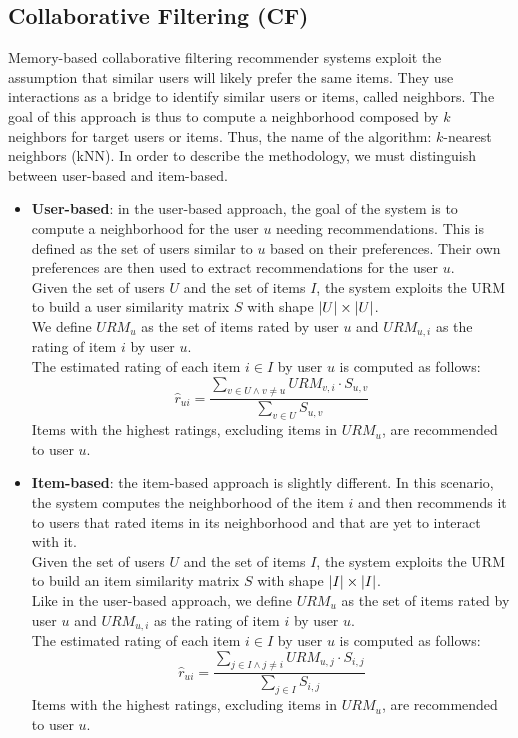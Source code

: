 \subsection{Collaborative Filtering (CF)}

Memory-based collaborative filtering recommender systems \cite{10.1007/978-0-387-85820-3_1} exploit the assumption that similar users will likely prefer the same items. They use interactions as a bridge to identify similar users or items, called neighbors. The goal of this approach is thus to compute a neighborhood composed by $k$ neighbors for target users or items. Thus, the name of the algorithm: $k$-nearest neighbors (kNN). In order to describe the methodology, we must distinguish between user-based and item-based.
\begin{itemize}
\item \textbf{User-based}: in the user-based approach, the goal of the system is to compute a neighborhood for the user $u$ needing recommendations. This is defined as the set of users similar to $u$ based on their preferences. Their own preferences are then used to extract recommendations for the user $u$.\\
Given the set of users $U$ and the set of items $I$, the system exploits the URM to build a user similarity matrix $S$ with shape $\left\lvert U\right\rvert \times \left\lvert U\right\rvert$.\\
We define $URM_u$ as the set of items rated by user $u$ and $URM_{u,i}$ as the rating of item $i$ by user $u$.\\
The estimated rating of each item $i \in I$ by user $u$ is computed as follows:
\begin{equation*}
\hat{r}_{ui} = \frac{\sum_{v \in U \wedge v \neq u} URM_{v,i} \cdot S_{u,v}}{\sum_{v \in U} S_{u,v}}
\end{equation*}
Items with the highest ratings, excluding items in $URM_u$, are recommended to user $u$.
\item \textbf{Item-based}: the item-based approach is slightly different. In this scenario, the system computes the neighborhood of the item $i$ and then recommends it to users that rated items in its neighborhood and that are yet to interact with it.\\
Given the set of users $U$ and the set of items $I$, the system exploits the URM to build an item similarity matrix $S$ with shape $\left\lvert I\right\rvert \times \left\lvert I\right\rvert$.\\
Like in the user-based approach, we define $URM_u$ as the set of items rated by user $u$ and $URM_{u,i}$ as the rating of item $i$ by user $u$.\\
The estimated rating of each item $i \in I$ by user $u$ is computed as follows:
\begin{equation*}
\hat{r}_{ui} = \frac{\sum_{j \in I \wedge j \neq i} URM_{u,j} \cdot S_{i,j}}{\sum_{j \in I} S_{i,j}}
\end{equation*}
Items with the highest ratings, excluding items in $URM_u$, are recommended to user $u$.
\end{itemize}\par
